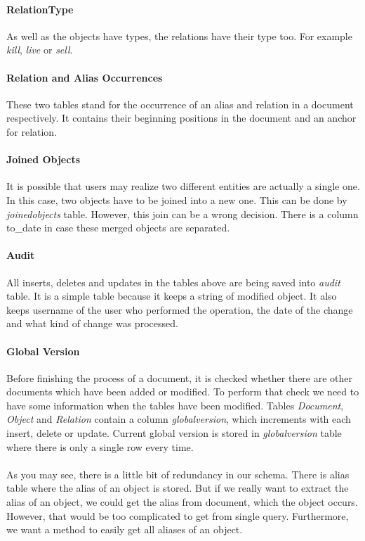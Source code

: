 \paragraph{RelationType} As well as the objects have types, the relations have their type too. 
For example \emph{kill}, \emph{live} or \emph{sell}.

\paragraph{Relation and Alias Occurrences} These two tables stand for the occurrence of an 
alias and relation in a document respectively. It contains their beginning positions in the document 
and an anchor for relation. 

\paragraph{Joined Objects} It is possible that users may realize two different entities are actually 
a single one. In this case, two objects have to be joined into a new one. This can be done by 
\emph{joinedobjects} table. However, this join can be a wrong decision. There is a column 
to\_{}date in case these merged objects are separated.

\paragraph{Audit} All inserts, deletes and updates in the tables above are being saved into \emph{audit} 
table. It is a simple table because it keeps a string of modified object. It also 
keeps username of the user who performed the operation, the date of the change and what kind 
of change was processed.
 
\paragraph{Global Version} Before finishing the process of a document, it is checked whether there
are other documents which have been added or modified. To perform that check we need to have some information
when the tables have been modified. Tables \emph{Document}, \emph{Object} and \emph{Relation} 
contain a column \emph{globalversion}, which increments with each insert, delete or update. 
Current global version is stored in \emph{globalversion} table where there is only a single row every time.

\paragraph{} As you may see, there is a little bit of redundancy in our schema. There is alias table where the alias of an object is stored. But if we really want to extract the alias of an object, we could get the alias from document, which the object occurs. However, that would be too complicated to get from single query. Furthermore, we want a method to easily get all aliases of an object.

